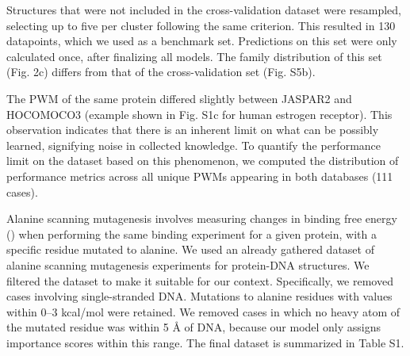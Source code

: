 \par
Structures that were not included in the cross-validation dataset were resampled, selecting up to five per cluster following the same criterion. This resulted in 130 datapoints, which we used as a benchmark set. Predictions on this set were only calculated once, after finalizing all models. The family distribution of this set (Fig. 2c) differs from that of the cross-validation set (Fig. S5b).
\par
The PWM of the same protein differed slightly between JASPAR2 and HOCOMOCO3 (example shown in Fig. S1c for human estrogen receptor). This observation indicates that there is an inherent limit on what can be possibly learned, signifying noise in collected knowledge. To quantify the performance limit on the dataset based on this phenomenon, we computed the distribution of performance metrics across all unique PWMs appearing in both databases (111 cases). 
\par
Alanine scanning mutagenesis involves measuring changes in binding free energy () when performing the same binding experiment for a given protein, with a specific residue mutated to alanine. We used an already gathered dataset \citep{Peng2018} of alanine scanning mutagenesis experiments for protein-DNA structures. We filtered the dataset to make it suitable for our context. Specifically, we removed cases involving single-stranded DNA. Mutations to alanine residues with  values within 0–3 kcal/mol were retained. We removed cases in which no heavy atom of the mutated residue was within 5 Å of DNA, because our model only assigns importance scores within this range. The final dataset is summarized in Table S1.
